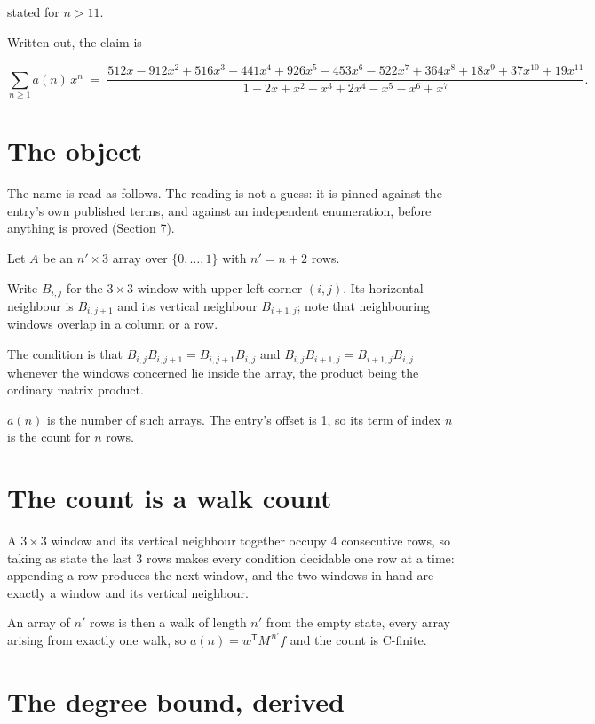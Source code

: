 \documentclass[11pt]{article}
\theoremstyle{definition}
\begin{document}
stated for $n > 11$.

Written out, the claim is

\[\sum_{n \ge 1} a(n)\,x^n \;=\; \frac{512x - 912x^{2} + 516x^{3} - 441x^{4} + 926x^{5} - 453x^{6} - 522x^{7} + 364x^{8} + 18x^{9} + 37x^{10} + 19x^{11}}{1 - 2x + x^{2} - x^{3} + 2x^{4} - x^{5} - x^{6} + x^{7}}.\]

\section{The object}

The name is read as follows. The reading is not a guess: it is pinned against the entry's own published terms, and against an independent enumeration, before anything is proved (Section 7).

Let $A$ be an $n' \times 3$ array over $\{0,\dots,1\}$ with $n' = n + 2$ rows.

Write $B_{i,j}$ for the $3\times3$ window with upper left corner $(i,j)$. Its horizontal neighbour is $B_{i,j+1}$ and its vertical neighbour $B_{i+1,j}$; note that neighbouring windows overlap in a column or a row.

The condition is that $B_{i,j}B_{i,j+1} = B_{i,j+1}B_{i,j}$ and $B_{i,j}B_{i+1,j} = B_{i+1,j}B_{i,j}$ whenever the windows concerned lie inside the array, the product being the ordinary matrix product.

$a(n)$ is the number of such arrays. The entry's offset is 1, so its term of index $n$ is the count for $n$ rows.

\section{The count is a walk count}

A $3\times3$ window and its vertical neighbour together occupy $4$ consecutive rows, so taking as state the last $3$ rows makes every condition decidable one row at a time: appending a row produces the next window, and the two windows in hand are exactly a window and its vertical neighbour.

An array of $n'$ rows is then a walk of length $n'$ from the empty state, every array arising from exactly one walk, so $a(n) = w^{\mathsf T}M^{\,n'}f$ and the count is C-finite.

\section{The degree bound, derived}
\end{document}
